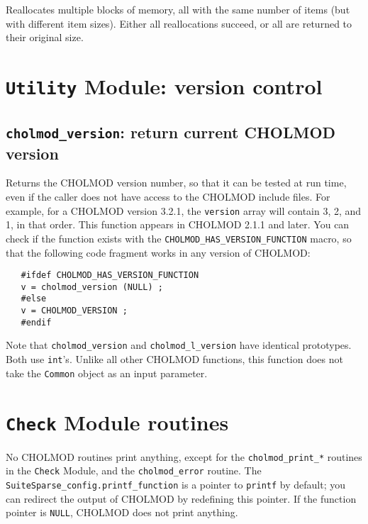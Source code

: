 \documentclass[11pt]{article}
\begin{document}

Reallocates multiple blocks of memory, all with the same number of items (but
with different item sizes).  Either all reallocations succeed, or all are
returned to their original size.

\newpage \section{{\tt Utility} Module: version control}

\subsection{{\tt cholmod\_version}: return current CHOLMOD version}


Returns the CHOLMOD version number, so that it can be tested at run time, even
if the caller does not have access to the CHOLMOD include files.  For example,
for a CHOLMOD version 3.2.1, the {\tt version} array will contain 3, 2, and 1,
in that order.  This function appears in CHOLMOD 2.1.1 and later.  You can
check if the function exists with the {\tt CHOLMOD\_HAS\_VERSION\_FUNCTION}
macro, so that the following code fragment works in any version of CHOLMOD:

\begin{verbatim}
   #ifdef CHOLMOD_HAS_VERSION_FUNCTION
   v = cholmod_version (NULL) ;
   #else
   v = CHOLMOD_VERSION ;
   #endif
\end{verbatim}

Note that {\tt cholmod\_version} and {\tt cholmod\_l\_version} have identical
prototypes.  Both use {\tt int}'s.  Unlike all other CHOLMOD functions, this
function does not take the {\tt Common} object as an input parameter.

\newpage \section{{\tt Check} Module routines}

No CHOLMOD routines print anything, except for the {\tt cholmod\_print\_*}
routines in the {\tt Check} Module, and the {\tt cholmod\_error} routine.  The
{\tt SuiteSparse\_config.printf\_function} is a pointer to {\tt printf} by
default; you can redirect the output of CHOLMOD by redefining this pointer.  If
the function pointer is {\tt NULL}, CHOLMOD does not print anything.
\end{document}
